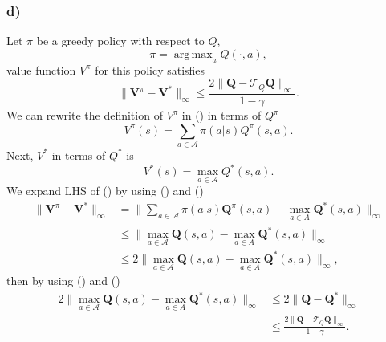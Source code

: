 \documentclass[12pt]{article}
\DeclareMathOperator*{\argmax}{arg\,max}
\begin{document}
\subsubsection*{d)}
Let $\pi$ be a greedy policy with respect to $Q$,
\begin{equation}
    \pi = \argmax_a Q(\cdot, a),
\end{equation}
value function $V^\pi$ for this policy satisfies
\begin{equation}
    \|\mathbf{V}^\pi - \mathbf{V}^*\|_\infty \leq \frac{2\|\mathbf{Q}-\mathcal{T}_Q\mathbf{Q}\|_\infty}{1-\gamma}.
    \label{eq:2dquest}
\end{equation}
We can rewrite the definition of $V^\pi$ in () in terms of $Q^\pi$
\begin{equation}
    V^\pi(s) = \sum_{a \in \mathcal{A}} \pi(a|s) Q^\pi(s,a).
    \label{eq:vpiinq}
\end{equation}
Next, $V^*$ in terms of $Q^*$ is
\begin{equation}
    V^*(s) = \max_{a\in \mathcal{A}}Q^*(s,a).
    \label{eq:vstar}
\end{equation}
We expand LHS of () by using () and ()
\begin{equation*}
    \begin{split}
        \|\mathbf{V}^\pi - \mathbf{V}^*\|_\infty &= \|\sum_{a \in \mathcal{A}} \pi(a|s) \mathbf{Q}^\pi(s,a) - \max_{a\in A}\mathbf{Q}^*(s,a)\|_\infty \\
        &\leq \|\max_{a\in \mathcal{A}}\mathbf{Q}(s,a) - \max_{a\in A}\mathbf{Q}^*(s,a)\|_\infty \\
        &\leq 2\|\max_{a\in \mathcal{A}}\mathbf{Q}(s,a) - \max_{a\in A}\mathbf{Q}^*(s,a)\|_\infty,
    \end{split}
\end{equation*}
then by using () and ()
\begin{equation*}
    \begin{split}
        2\|\max_{a\in \mathcal{A}}\mathbf{Q}(s,a) - \max_{a\in A}\mathbf{Q}^*(s,a)\|_\infty &\leq 2 \|\mathbf{Q}-\mathbf{Q}^*\|_\infty \\
        &\leq \frac{2\|\mathbf{Q} - \mathcal{T}_Q\mathbf{Q}\|_\infty}{1-\gamma}.
    \end{split}
\end{equation*}
\end{document}
